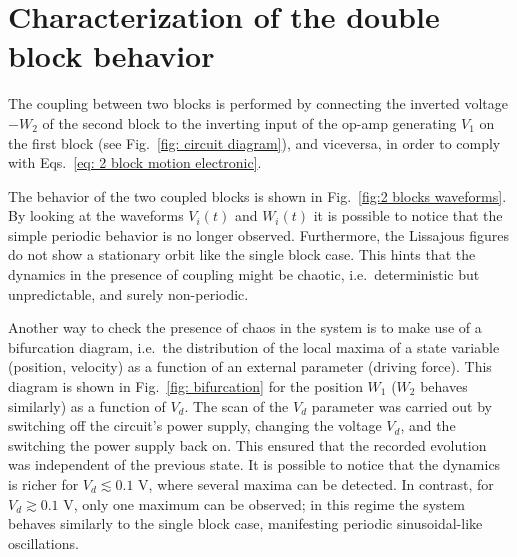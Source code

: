 \section{Characterization of the double block behavior}\label{sec: double block characterization}

The coupling between two blocks is performed by connecting the inverted voltage $-W_2$ of the second block to the
inverting input of the op-amp generating $V_1$ on the first block (see Fig.~\ref{fig: circuit diagram}), and viceversa, in order
to comply with Eqs.~\ref{eq: 2 block motion electronic}.

The behavior of the two coupled blocks is shown in Fig.~\ref{fig:2 blocks waveforms}.
By looking at the waveforms $V_i(t)$ and $W_i(t)$ it is possible to notice that the simple periodic behavior
is no longer observed. Furthermore, the Lissajous figures do not show a stationary orbit like the single block case.
This hints that the dynamics in the presence of coupling might be chaotic, i.e.\ deterministic but unpredictable,
and surely non-periodic.

Another way to check the presence of chaos in the system is to make use of a bifurcation diagram, i.e.\ the distribution
of the local maxima of a state variable (position, velocity) as a function of an external parameter (driving force).
This diagram is shown in Fig.~\ref{fig: bifurcation} for the position $W_1$ ($W_2$ behaves similarly) as a function of $V_d$.
The scan of the $V_d$ parameter was carried out by switching off the circuit's power supply, changing the voltage $V_d$,
and the switching the power supply back on. This ensured that the recorded evolution was independent of the previous state.
It is possible to notice that the dynamics is richer for $V_d\lesssim0.1$ V, where several maxima can be detected.
In contrast, for $V_d\gtrsim0.1$ V, only one maximum can be observed; in this regime the system behaves similarly
to the single block case, manifesting periodic sinusoidal-like oscillations.

